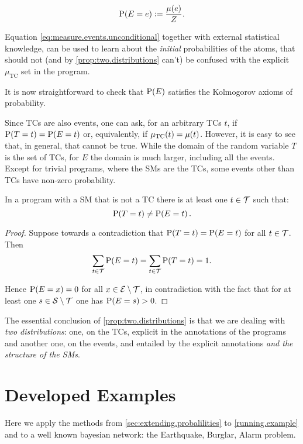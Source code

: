 \documentclass{llncs}
\newcommand{\at}[1]{\ensuremath{\!\del{#1}}}
\newcommand{\fml}[1]{\ensuremath{{\cal #1}}}
\newcommand{\pr}[1]{\ensuremath{\mathrm{P}\at{#1}}}
\newcommand{\pw}[1]{\ensuremath{\mu\at{#1}}}
\newcommand{\pwcfname}{\ensuremath{\mu_{\textrm{TC}}}}
\newcommand{\pwc}[1]{\ensuremath{\pwcfname\at{#1}}}
\begin{document}
\begin{equation}
    \pr{E = e} := \frac{\pw{e}}{Z}.\label{eq:probability.event}
\end{equation}

Equation \eqref{eq:measure.events.unconditional} together with external statistical knowledge, can be used to learn about the \emph{initial} probabilities of the atoms, that should not (and by \cref{prop:two.distributions} can't) be confused with the explicit $\pwcfname$ set in the program.

It is now straightforward to check that $\pr{E}$ satisfies the Kolmogorov axioms of probability.

Since \aclp{TC} are also events, one can ask, for an arbitrary \aclp{TC}  $t$, if $\pr{T = t} = \pr{E = t}$ or, equivalently, if $\pwc{t} = \pw{t}$.  However, it is easy to see that, in general, that cannot be true. While the domain of the random variable $T$ is the set of \aclp{TC}, for $E$ the domain is much larger, including all the events. Except for trivial programs, where the \acp{SM} are the \acp{TC}, some events other than \aclp{TC} have non-zero probability.

\begin{proposition} \label{prop:two.distributions}
    In a program with a \acl{SM} that is not a \acl{TC} there is at least one $t\in\fml{T}$ such that:
    \begin{equation}
        \pr{T = t} \not= \pr{E = t}. \label{eq:two.distributions}
    \end{equation}
\end{proposition}

\begin{proof}
    Suppose towards a contradiction that $\pr{T = t} = \pr{E = t}$ for all $t \in \fml{T}$.  Then
    $$
        \sum_{t\in\fml{T}} \pr{E = t} = \sum_{t\in\fml{T}} \pr{T = t} = 1.
    $$

    Hence $\pr{E = x} = 0$ for all $x \in \fml{E}\setminus\fml{T}$, in contradiction with the fact that for at least one $s \in \fml{S}\setminus\fml{T}$ one has $\pr{E = s} > 0$.
\end{proof}

The essential conclusion of \cref{prop:two.distributions} is that we are dealing with \emph{two distributions}: one, on the \acp{TC}, explicit in the annotations of the programs and another one, on the events, and entailed by the explicit annotations \emph{and the structure of the \aclp{SM}}.

%
%
%
\section{Developed Examples}\label{sec:developed.examples}
%
%
%
Here we apply the methods from \cref{sec:extending.probalilities} to \cref{running.example} and to a well known bayesian network: the Earthquake, Burglar, Alarm problem.
\end{document}

